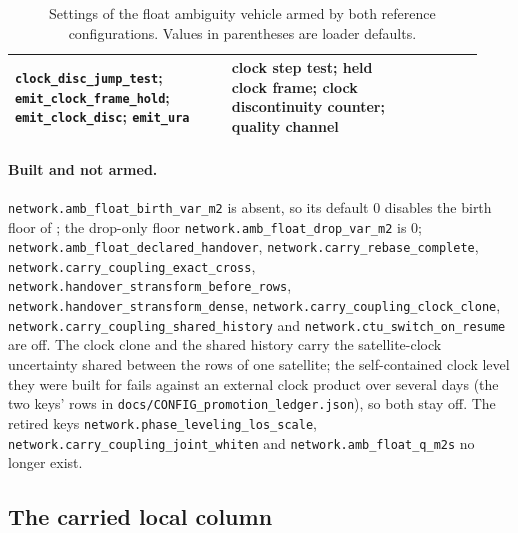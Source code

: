 \documentclass[main.tex]{subfiles}
\begin{document}
\begin{table}[htbp]
\begin{tabular}{@{}>{\raggedright\arraybackslash}p{0.43\linewidth}>{\raggedright\arraybackslash}p{0.35\linewidth}>{\raggedright\arraybackslash}p{0.15\linewidth}@{}}
\texttt{clock\_disc\_jump\_test}; \texttt{emit\_clock\_frame\_hold}; \texttt{emit\_clock\_disc}; \texttt{emit\_ura} &
  clock step test; held clock frame; clock discontinuity counter; quality channel & \\
\bottomrule
\end{tabular}
\caption{Settings of the float ambiguity vehicle armed by both reference
configurations. Values in parentheses are loader defaults.}
\label{tab:net-vehicle-knobs}
\end{table}

\paragraph{Built and not armed.}
\texttt{network.amb\_float\_birth\_var\_m2} is absent, so its default $0$
disables the birth floor of ; the drop-only floor
\texttt{network.amb\_float\_drop\_var\_m2} is $0$;
\texttt{network.amb\_float\_declared\_handover},
\texttt{network.carry\_rebase\_complete},
\texttt{network.carry\_coupling\_exact\_cross},
\texttt{network.handover\_stransform\_before\_rows},
\texttt{network.handover\_stransform\_dense},
\texttt{network.carry\_coupling\_clock\_clone},
\texttt{network.carry\_coupling\_shared\_history} and
\texttt{network.ctu\_switch\_on\_resume} are off. The clock clone and the
shared history carry the satellite-clock uncertainty shared between the
rows of one satellite; the self-contained clock level they were built for
fails against an external clock product over several days (the two
keys' rows in \texttt{docs/CONFIG\_promotion\_ledger.json}), so both stay off.
The retired keys \texttt{network.phase\_leveling\_los\_scale},
\texttt{network.carry\_coupling\_joint\_whiten} and
\texttt{network.amb\_float\_q\_m2s} no longer exist.

\subsection{The carried local column}
\label{sec:net-vehicle-column}
\end{document}
